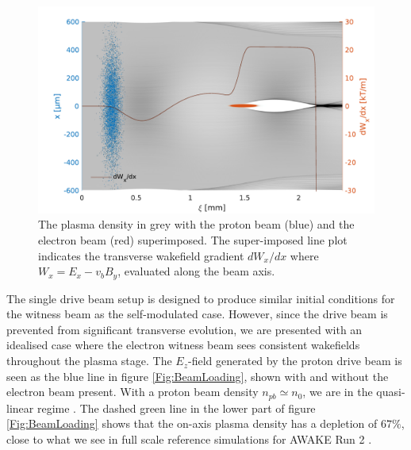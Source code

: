 \documentclass[aps,prstab,reprint,amsmath,amssymb,groupedaddress]{revtex4-1}
\begin{document}
\begin{figure}[hbt]
    \includegraphics[width=\linewidth,trim={2mm 0mm 2mm 0mm},clip]{figures/plasmaDenTWake}
    \caption{\label{Fig:PlasmaDenTWake} The plasma density in grey with the proton beam (blue) and the electron beam
        (red) superimposed. The super-imposed line plot indicates the transverse wakefield gradient $dW_{x}/dx$ where
        $W_{x} = E_{x} - v_{b} B_{y}$, evaluated along the beam axis.}
\end{figure}


The single drive beam setup is designed to produce similar initial conditions for the witness beam as the self-modulated
case. However, since the drive beam is prevented from significant transverse evolution, we are presented with an
idealised case where the electron witness beam sees consistent wakefields throughout the plasma stage. The $E_{z}$-field
generated by the proton drive beam is seen as the blue line in figure \ref{Fig:BeamLoading}, shown with and without the
electron beam present. With a proton beam density $n_{pb} \simeq n_{0}$, we are in the quasi-linear regime
\cite{rosenzweig:2010}. The dashed green line in the lower part of figure \ref{Fig:BeamLoading} shows that the on-axis
plasma density has a depletion of $67\%$, close to what we see in full scale reference simulations for AWAKE Run 2
\cite{awake_collaboration:2016}.

\end{document}
